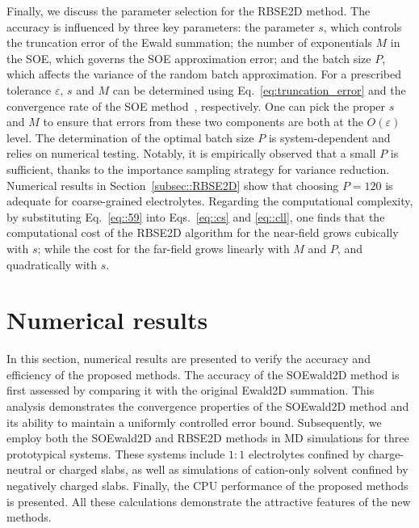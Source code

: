 Finally, we discuss the parameter selection for the RBSE2D method. The accuracy is influenced by three key parameters: the parameter $s$, which controls the truncation error of the Ewald summation; the number of exponentials $M$ in the SOE, which governs the SOE approximation error; and the batch size $P$, which affects the variance of the random batch approximation. For a prescribed tolerance $\varepsilon$, $s$ and $M$ can be determined using Eq.~\eqref{eq:truncation_error} and the convergence rate of the SOE method~\cite{gao2021kernelindependent}, respectively. One can pick the proper $s$ and $M$ to ensure that errors from these two components are both at the $O(\varepsilon)$ level. 
The determination of the optimal batch size $P$ is system-dependent and relies on numerical testing. Notably, it is empirically observed that a small $P$ is sufficient, thanks to the importance sampling strategy for variance reduction. Numerical results in Section~\ref{subsec::RBSE2D} show that choosing $P=120$ is adequate for coarse-grained electrolytes. 
Regarding the computational complexity, by substituting Eq.~\eqref{eq::59} into Eqs.~\eqref{eq::cs} and \eqref{eq::cll}, one finds that the computational cost of the RBSE2D algorithm for the near-field grows cubically with $s$; while the cost for the far-field grows linearly with $M$ and $P$, and quadratically with $s$.


\section{Numerical results} \label{sec:md}
In this section, numerical results are presented to verify the accuracy and efficiency of the proposed methods. 
The accuracy of the SOEwald2D method is first assessed by comparing it with the original Ewald2D summation. 
This analysis demonstrates the convergence properties of the SOEwald2D method and its ability to maintain a uniformly controlled error bound. 
Subsequently, we employ both the SOEwald2D and RBSE2D methods in MD simulations for three prototypical systems.
These systems include $1:1$ electrolytes confined by charge-neutral or charged slabs, as well as simulations of cation-only solvent confined by negatively charged slabs. 
Finally, the CPU performance of the proposed methods is presented. 
All these calculations demonstrate the attractive features of the new methods.

